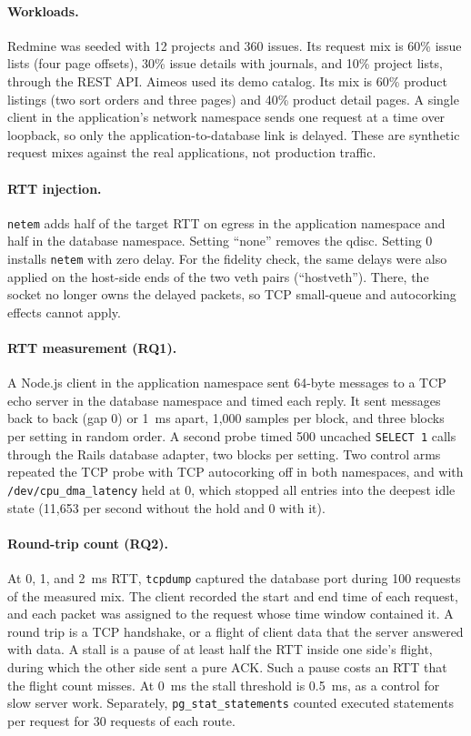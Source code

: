 \documentclass[11pt]{article}
\begin{document}
\paragraph{Workloads.} Redmine was seeded with 12 projects and 360 issues. Its request mix is
60\% issue lists (four page offsets), 30\% issue details with journals, and 10\% project
lists, through the REST API. Aimeos used its demo catalog. Its mix is 60\% product listings
(two sort orders and three pages) and 40\% product detail pages. A single client in the
application's network namespace sends one request at a time over loopback, so only the
application-to-database link is delayed. These are synthetic request mixes against the real
applications, not production traffic.

\paragraph{RTT injection.} \texttt{netem} adds half of the target RTT on egress in the
application namespace and half in the database namespace. Setting ``none'' removes the qdisc.
Setting 0 installs \texttt{netem} with zero delay. For the fidelity check, the same delays were
also applied on the host-side ends of the two veth pairs (``hostveth''). There, the socket no
longer owns the delayed packets, so TCP small-queue and autocorking effects cannot apply.

\paragraph{RTT measurement (RQ1).} A Node.js client in the application namespace sent
64-byte messages to a TCP echo server in the database namespace and timed each reply. It sent
messages back to back (gap 0) or 1~ms apart, 1{,}000 samples per block, and three blocks per
setting in random order. A second probe timed 500 uncached \texttt{SELECT 1} calls through
the Rails database adapter, two blocks per setting. Two control arms repeated the TCP probe
with TCP autocorking off in both namespaces, and with \texttt{/dev/cpu\_dma\_latency} held at
0, which stopped all entries into the deepest idle state (11{,}653 per second without the
hold and 0 with it).

\paragraph{Round-trip count (RQ2).} At 0, 1, and 2~ms RTT, \texttt{tcpdump} captured the
database port during 100 requests of the measured mix. The client recorded the start and end time of
each request, and each packet was assigned to the request whose time window contained it. A
round trip is a TCP handshake, or a flight of client data that the server answered with
data. A stall is a pause of at least half the RTT inside one side's flight, during which the
other side sent a pure ACK. Such a pause costs an RTT that the flight count misses. At 0~ms the
stall threshold is 0.5~ms, as a control for slow server work. Separately, \texttt{pg\_stat\_statements} counted executed statements per request for
30 requests of each route.
\end{document}
